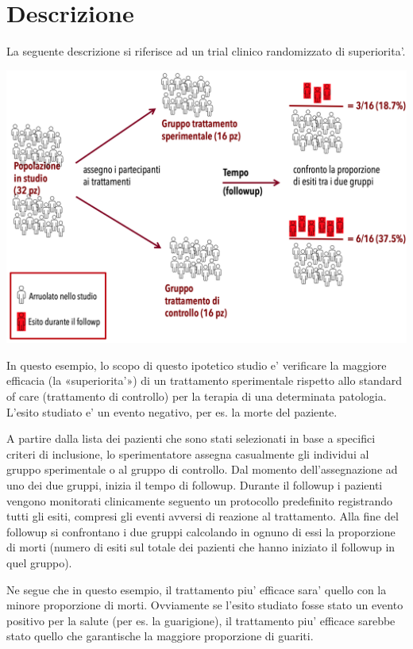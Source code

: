 \documentclass[]{book}
\begin{document}
\hypertarget{descrizione}{%
\section{Descrizione}\label{descrizione}}

La seguente descrizione si riferisce ad un trial clinico randomizzato di superiorita'.

\includegraphics[width=1\textwidth,height=\textheight]{./img/schema-studio-sper.png}

In questo esempio, lo scopo di questo ipotetico studio e' verificare la maggiore efficacia (la «superiorita'») di un trattamento sperimentale rispetto allo standard of care (trattamento di controllo) per la terapia di una determinata patologia. L'esito studiato e' un evento negativo, per es. la morte del paziente.

A partire dalla lista dei pazienti che sono stati selezionati in base a specifici criteri di inclusione, lo sperimentatore assegna casualmente gli individui al gruppo sperimentale o al gruppo di controllo. Dal momento dell'assegnazione ad uno dei due gruppi, inizia il tempo di followup. Durante il followup i pazienti vengono monitorati clinicamente seguento un protocollo predefinito registrando tutti gli esiti, compresi gli eventi avversi di reazione al trattamento. Alla fine del followup si confrontano i due gruppi calcolando in ognuno di essi la proporzione di morti (numero di esiti sul totale dei pazienti che hanno iniziato il followup in quel gruppo).

Ne segue che in questo esempio, il trattamento piu' efficace sara' quello con la minore proporzione di morti. Ovviamente se l'esito studiato fosse stato un evento positivo per la salute (per es. la guarigione), il trattamento piu' efficace sarebbe stato quello che garantische la maggiore proporzione di guariti.
\end{document}

